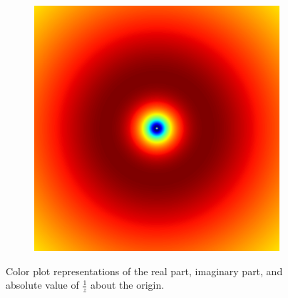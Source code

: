 \begin{figure}
\begin{subfigure}{.32\textwidth}
\end{subfigure}
\begin{subfigure}{.32\textwidth}
\includegraphics[width=\textwidth]{inv_abs.png}
\end{subfigure}
\caption{Color plot representations of the real part, imaginary part, and absolute value of $\frac{1}{z}$ about the origin.}
\label{fig:inv_color}
\end{figure}

